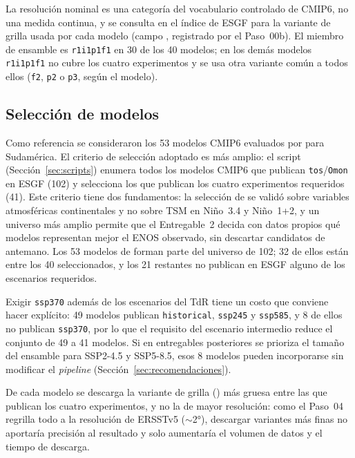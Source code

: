 La resolución nominal es una categoría del vocabulario controlado de CMIP6, no una medida continua, y se consulta en el índice de ESGF para la variante de grilla usada por cada modelo (campo , registrado por el Paso~00b). El miembro de ensamble es \texttt{r1i1p1f1} en 30 de los 40 modelos; en los demás modelos \texttt{r1i1p1f1} no cubre los cuatro experimentos y se usa otra variante común a todos ellos (\texttt{f2}, \texttt{p2} o \texttt{p3}, según el modelo).

\subsection{Selección de modelos}
\label{sec:desviacion}

Como referencia se consideraron los 53 modelos CMIP6 evaluados por \citet{bruno2023} para Sudamérica. El criterio de selección adoptado es más amplio: el script  (Sección~\ref{sec:scripts}) enumera todos los modelos CMIP6 que publican \texttt{tos}/\texttt{Omon} en ESGF (102) y selecciona los que publican los cuatro experimentos requeridos (41). Este criterio tiene dos fundamentos: la selección de \citet{bruno2023} se validó sobre variables atmosféricas continentales y no sobre TSM en Niño~3.4 y Niño~1+2, y un universo más amplio permite que el Entregable~2 decida con datos propios qué modelos representan mejor el ENOS observado, sin descartar candidatos de antemano. Los 53 modelos de \citet{bruno2023} forman parte del universo de 102; 32 de ellos están entre los 40 seleccionados, y los 21 restantes no publican en ESGF alguno de los escenarios requeridos.

Exigir \texttt{ssp370} además de los escenarios del TdR tiene un costo que conviene hacer explícito: 49 modelos publican \texttt{historical}, \texttt{ssp245} y \texttt{ssp585}, y 8 de ellos no publican \texttt{ssp370}, por lo que el requisito del escenario intermedio reduce el conjunto de 49 a 41 modelos. Si en entregables posteriores se prioriza el tamaño del ensamble para SSP2-4.5 y SSP5-8.5, esos 8 modelos pueden incorporarse sin modificar el \emph{pipeline} (Sección~\ref{sec:recomendaciones}).

De cada modelo se descarga la variante de grilla () más gruesa entre las que publican los cuatro experimentos, y no la de mayor resolución: como el Paso~04 regrilla todo a la resolución de ERSSTv5 ($\sim$2°), descargar variantes más finas no aportaría precisión al resultado y solo aumentaría el volumen de datos y el tiempo de descarga.

